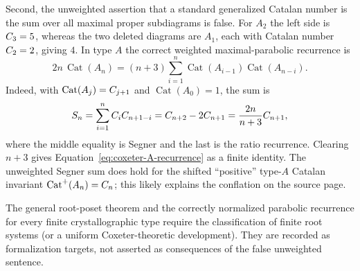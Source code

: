 Second, the unweighted assertion that a standard generalized Catalan number
is the sum over all maximal proper subdiagrams is false.  For $A_2$ the left
side is $C_3=5$, whereas the two deleted diagrams are $A_1$, each with
Catalan number $C_2=2$, giving $4$.  In type $A$ the correct weighted
maximal-parabolic recurrence is
\[
 2n\,\operatorname{Cat}(A_n)
  =(n+3)\sum_{i=1}^{n}
      \operatorname{Cat}(A_{i-1})\operatorname{Cat}(A_{n-i}).  \tag{7.18}\label{eq:coxeter-A-recurrence}
\]
Indeed, with $\operatorname{Cat}(A_j)=C_{j+1}$ and
$\operatorname{Cat}(A_0)=1$, the sum is
\[
 S_n=\sum_{i=1}^{n}C_iC_{n+1-i}
     =C_{n+2}-2C_{n+1}
     =\frac{2n}{n+3}C_{n+1},
\]
where the middle equality is Segner and the last is the ratio recurrence.
Clearing $n+3$ gives Equation~\eqref{eq:coxeter-A-recurrence} as a finite
\ipra{} identity.  The unweighted Segner sum does hold for the shifted
``positive'' type-$A$ Catalan invariant $\operatorname{Cat}^{+}(A_n)=C_n$;
this likely explains the conflation on the source page.

The general root-poset theorem and the correctly normalized parabolic
recurrence for every finite crystallographic type require the classification
of finite root systems (or a uniform Coxeter-theoretic development).  They are
recorded as formalization targets, not asserted as consequences of the false
unweighted sentence.
